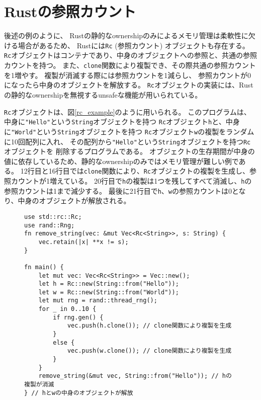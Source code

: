 \documentclass{sumiilab-paper}
\theoremstyle{mystyle}
\numberwithin{definition}{chapter} %
\begin{document}
\section{Rustの参照カウント}
後述の例のように、
Rustの静的なownershipのみによるメモリ管理は柔軟性に欠ける場合があるため、
Rustには\texttt{Rc} (参照カウント) オブジェクトも存在する。
\texttt{Rc}オブジェクトはコンテナであり、中身のオブジェクトへの参照と、共通の参照カウントを持つ。
また、\texttt{clone}関数により複製でき、その際共通の参照カウントを1増やす。
複製が消滅する際には参照カウントを1減らし、
参照カウントが0になったら中身のオブジェクトを解放する。
\texttt{Rc}オブジェクトの実装には、Rustの静的なownershipを無視するunsafeな機能が用いられている。

\texttt{Rc}オブジェクトは、図\ref{rc_example}のように用いられる。
このプログラムは、
中身に\texttt{"Hello"}という\texttt{String}オブジェクトを持つ
\texttt{Rc}オブジェクト\texttt{h}と、中身に\texttt{"World"}という\texttt{String}オブジェクトを持つ
\texttt{Rc}オブジェクト\texttt{w}の複製をランダムに10回配列に入れ、
その配列から\texttt{"Hello"}という\texttt{String}オブジェクトを持つ\texttt{Rc}オブジェクトを
削除するプログラムである。
オブジェクトの生存期間が中身の値に依存しているため、静的なownershipのみではメモリ管理が難しい例である。
12行目と16行目では\texttt{clone}関数により、\texttt{Rc}オブジェクトの複製を生成し、参照カウントが1増えている。
20行目で\texttt{h}の複製は1つを残してすべて消滅し、\texttt{h}の参照カウントは1まで減少する。
最後に21行目で\texttt{h}、\texttt{w}の参照カウントは0となり、中身のオブジェクトが解放される。
\begin{figure}[htp]
\begin{lstlisting}[caption=Rcオブジェクトの利用例, label=rc_example, captionpos=b]
use std::rc::Rc;
use rand::Rng;
fn remove_string(vec: &mut Vec<Rc<String>>, s: String) {
    vec.retain(|x| **x != s);
}

fn main() {
    let mut vec: Vec<Rc<String>> = Vec::new();
    let h = Rc::new(String::from("Hello"));
    let w = Rc::new(String::from("World"));
    let mut rng = rand::thread_rng();
    for _ in 0..10 {
        if rng.gen() {
            vec.push(h.clone()); // clone関数により複製を生成
        }
        else {
            vec.push(w.clone()); // clone関数により複製を生成
        }
    }
    remove_string(&mut vec, String::from("Hello")); // hの複製が消滅
} // hとwの中身のオブジェクトが解放
\end{lstlisting}
\end{figure}

\afterpage{\clearpage}
\newpage
\end{document}
